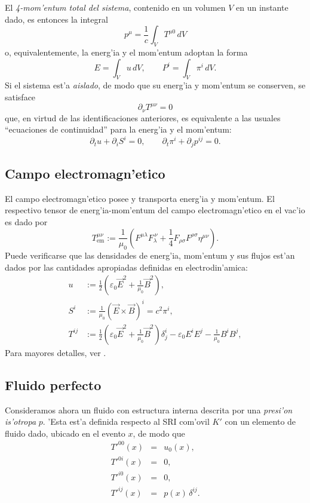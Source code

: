 El \textit{4-mom'entum total del sistema}, contenido en un volumen $V$ en un instante dado, es entonces la integral
\begin{equation}
p^\mu=\frac{1}{c}\int_V T^{\mu 0}\,dV \label{pmTmn}
\end{equation}
o, equivalentemente, la energ'ia y el mom'entum adoptan la forma
\begin{equation}
E=\int_V u\,dV, \qquad P^i=\int_V \pi^i\,dV.
\end{equation}
Si el sistema est'a \textit{aislado}, de modo que su energ'ia y mom'entum se conserven, se satisface 
\begin{equation}
 \partial_\nu T^{\mu \nu}=0
\end{equation}
que, en virtud de las identificaciones anteriores, es equivalente a las usuales ``ecuaciones de continuidad'' para la energ'ia y el mom'entum:
\begin{equation}
 \partial_tu+\partial_iS^i=0, \qquad \partial_t \pi^i+\partial_jp^{ij}=0.
\end{equation}


\subsection{Campo electromagn'etico}
El campo electromagn'etico posee y transporta energ'ia y mom'entum. El respectivo tensor de energ'ia-mom'entum del campo electromagn'etico en el vac'io es dado por
\begin{equation}
\boxed{T_\text{em}^{\mu\nu}:=\frac{1}{\mu_0}\left(  F^{\mu\lambda}F_\lambda^{\ \nu}+\frac{1}{4}F_{\rho\sigma}F^{\rho\sigma}\eta^{\mu\nu} \right).}  \label{temsimSI}
\end{equation}
Puede verificarse que las densidades de energ'ia, mom'entum y sus flujos est'an dados por las cantidades apropiadas definidas en electrodin'amica:
\begin{align}
u &:= \frac{1}{2}\left(\varepsilon_0\vec{E}^2+\frac{1}{\mu_0}\vec{B}^2\right),\label{uTheta}\\
S^i &:= \frac{1}{\mu_0}\left(\vec{E}\times\vec{B}\right)^i=c^2\pi^i, \label{STheta}\\
T^{ij} &:= \frac{1}{2}\left(\varepsilon_0\vec{E}^2+\frac{1}{\mu_0}\vec{B}^2\right)\delta_j^i-\varepsilon_0 E^i E^j -\frac{1}{\mu_0}B^i B^j , \label{TTheta}
\end{align}
Para mayores detalles, ver \cite{7}.


\subsection{Fluido perfecto}
Consideramos ahora un fluido con estructura interna descrita por una \textit{presi'on
is'otropa} $p$. 'Esta est'a definida respecto al SRI com'ovil $K'$ con un elemento de fluido dado, ubicado en el evento $x$, de modo que
\begin{eqnarray}
T'^{00}(x)&=&u_0(x) , \label{t00c}\\
T'^{0i}(x) &=&0, \label{t0ic}\\
T'^{i0}(x) &=&0, \label{ti0c}\\
T'^{ij}(x) &=&p(x)\,\delta^{ij} .\label{tijc}
\end{eqnarray}

